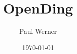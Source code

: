 \documentclass{article}
\title{OpenDing}
\author{Paul Werner}
\date{\today}
\begin{document}
\maketitle
\newcommand{\dir}{./songs}
\newcommand{\inputSongs}[1]{}


\newpage

\tableofcontents

\newpage


	\inputSongs{beatles}
\end{document}
